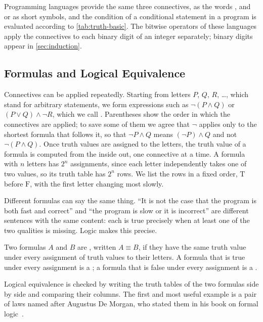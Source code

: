 Programming languages provide the same three connectives, as the words ,  and  or as short symbols, and the condition of a conditional statement in a program is evaluated according to \cref{tab:truth-basic}. The bitwise operators of these languages apply the connectives to each binary digit of an integer separately; binary digits appear in \cref{sec:induction}.

\subsection{Formulas and Logical Equivalence}

Connectives can be applied repeatedly. Starting from letters $P$, $Q$, $R$, \ldots, which stand for arbitrary statements, we form expressions such as $\neg(P\wedge Q)$ or $(P\vee Q)\wedge\neg R$, which we call . Parentheses show the order in which the connectives are applied; to save some of them we agree that $\neg$ applies only to the shortest formula that follows it, so that $\neg P\wedge Q$ means $(\neg P)\wedge Q$ and not $\neg(P\wedge Q)$. Once truth values are assigned to the letters, the truth value of a formula is computed from the inside out, one connective at a time. A formula with $n$ letters has $2^n$ assignments, since each letter independently takes one of two values, so its truth table has $2^n$ rows. We list the rows in a fixed order, $\mathrm T$ before $\mathrm F$, with the first letter changing most slowly.

Different formulas can say the same thing. ``It is not the case that the program is both fast and correct'' and ``the program is slow or it is incorrect'' are different sentences with the same content: each is true precisely when at least one of the two qualities is missing. Logic makes this precise.

\begin{definition}
\label{def:equivalence}
Two formulas $A$ and $B$ are , written $A\equiv B$, if they have the same truth value under every assignment of truth values to their letters. A formula that is true under every assignment is a ; a formula that is false under every assignment is a .
\end{definition}

Logical equivalence is checked by writing the truth tables of the two formulas side by side and comparing their columns. The first and most useful example is a pair of laws named after Augustus De Morgan, who stated them in his book on formal logic~\cite{demorgan1847}.

